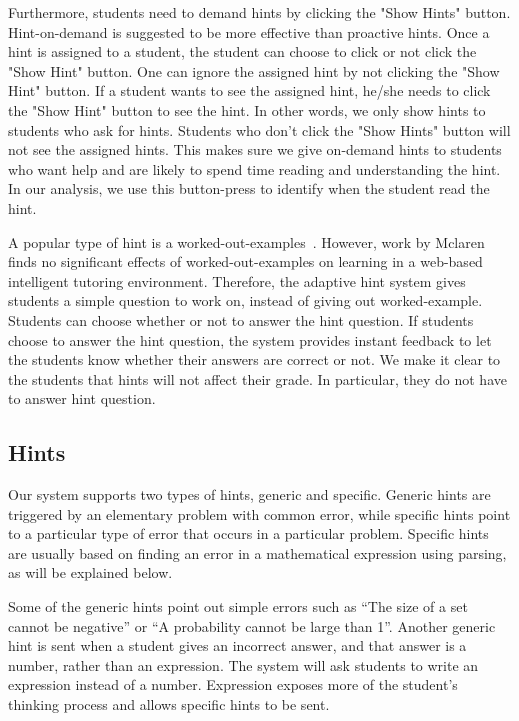 \documentclass{sigchi}
\begin{document}
Furthermore, students need to demand hints by clicking the "Show Hints" button. Hint-on-demand is suggested to be more effective than proactive hints\cite{Razzaq2010}. Once a hint is assigned to a student, the student can choose to click or not click the "Show Hint" button. One can ignore the assigned hint by not clicking the "Show Hint" button. If a student wants to see the assigned hint, he/she needs to click the "Show Hint" button to see the hint. In other words, we only show hints to students who ask for hints. Students who don't click the "Show Hints" button will not see the assigned hints. This makes sure we give on-demand hints to students who want help and are likely to spend time reading and understanding the hint.  In our analysis, we use this button-press to identify when the student read the hint.

A popular type of hint is a worked-out-examples~\cite{Atkinson2000}. However, work by Mclaren~\cite{McLaren2006} finds no significant effects of worked-out-examples on learning in a web-based intelligent tutoring environment. Therefore, the adaptive hint system gives students a simple question to work on, instead of giving out worked-example. Students can choose whether or not to answer the hint question. If students choose to answer the hint question, the system provides instant feedback to let the students know whether their answers are correct or not. We make it clear to the students that hints will not affect their grade. In particular, they do not have to answer hint question.

\subsection*{Hints}

Our system supports two types of hints, generic and specific. Generic hints are triggered by an elementary problem with common error, while specific hints point to a particular type of error that occurs in a particular problem. Specific hints are usually based on finding an error in a mathematical expression using parsing, as will be explained below.

Some of the generic hints point out simple errors such as ``The size of a set cannot be negative'' or ``A probability cannot be large than 1''. Another generic hint is sent when a student gives an incorrect answer, and that answer is a number, rather than an expression. The system will ask students to write an expression instead of a number. Expression exposes more of the student's thinking process and allows specific hints to be sent.
\end{document}
